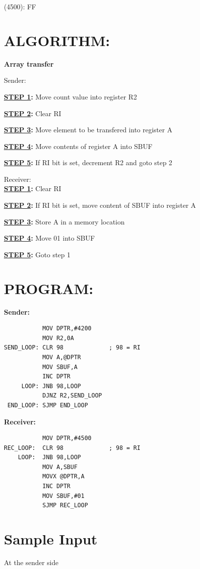 \documentclass[a4paper,28pt]{report}
\begin{document}
(4500): FF

\section*{ALGORITHM:}
\textbf{Array transfer}

\large{Sender:}

\textbf{\underline{STEP 1}:} Move count value into register R2

\textbf{\underline{STEP 2}:} Clear RI

\textbf{\underline{STEP 3}:} Move element to be transfered into register A

\textbf{\underline{STEP 4}:} Move contents of register A into SBUF

\textbf{\underline{STEP 5}:} If RI bit is set, decrement R2 and goto step 2

\large{Receiver:}\\

\textbf{\underline{STEP 1}:} Clear RI 

\textbf{\underline{STEP 2}:} If RI bit is set, move content of SBUF into register A

\textbf{\underline{STEP 3}:} Store A in a memory location

\textbf{\underline{STEP 4}:} Move 01 into SBUF

\textbf{\underline{STEP 5}:} Goto step 1

\section*{PROGRAM:}
\textbf{Sender:}
\begin{lstlisting}
           MOV DPTR,#4200
           MOV R2,0A
SEND_LOOP: CLR 98             ; 98 = RI
           MOV A,@DPTR
           MOV SBUF,A
           INC DPTR
     LOOP: JNB 98,LOOP
           DJNZ R2,SEND_LOOP
 END_LOOP: SJMP END_LOOP
\end{lstlisting}

\vspace{20pt}

\textbf{Receiver:}
\begin{lstlisting}
           MOV DPTR,#4500
REC_LOOP:  CLR 98             ; 98 = RI
    LOOP:  JNB 98,LOOP
           MOV A,SBUF
           MOVX @DPTR,A
           INC DPTR
           MOV SBUF,#01
           SJMP REC_LOOP
\end{lstlisting}


\section*{Sample Input}
At the sender side
\end{document}
